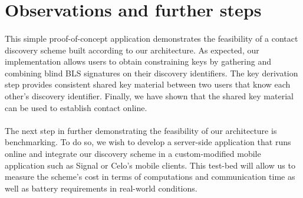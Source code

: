 \section{Observations and further steps}


\paragraph{} This simple proof-of-concept application demonstrates the feasibility of a contact discovery scheme built according to our architecture. As expected, our implementation allows users to obtain constraining keys by gathering and combining blind BLS signatures on their discovery identifiers. The key derivation step provides consistent shared key material between two users that know each other's discovery identifier. Finally, we have shown that the shared key material can be used to establish contact online.


\paragraph{} The next step in further demonstrating the feasibility of our architecture is benchmarking. To do so, we wish to develop a server-side application that runs online and integrate our discovery scheme in a custom-modified mobile application such as Signal or Celo's mobile clients. This test-bed will allow us to measure the scheme's cost in terms of computations and communication time as well as battery requirements in real-world conditions.































